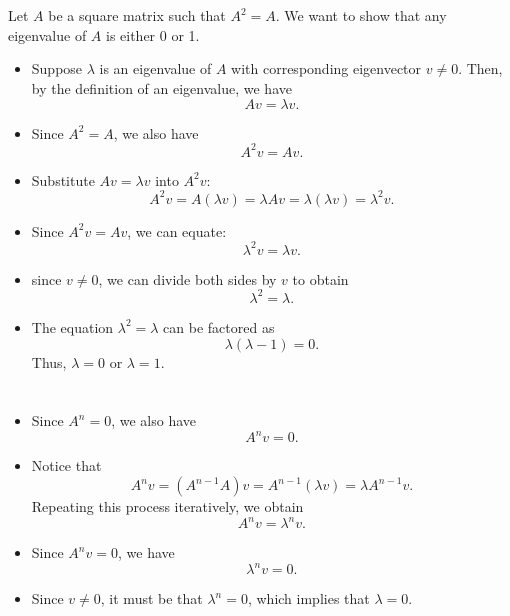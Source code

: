 \documentclass{article}
\begin{document}
\section{}
Let \( A \) be a square matrix such that \( A^2 = A \).
We want to show that any eigenvalue of \( A \) is either 0 or 1.

\begin{itemize}
    \item Suppose \( \lambda \) is an eigenvalue of \( A \) with corresponding eigenvector \( v \neq 0 \). Then, by the definition of an eigenvalue, we have
          \[
              A v = \lambda v.
          \]

    \item Since \( A^2 = A \), we also have
          \[
              A^2 v = A v.
          \]

    \item Substitute \( A v = \lambda v \) into \( A^2 v \):
          \[
              A^2 v = A(\lambda v) = \lambda A v = \lambda (\lambda v) = \lambda^2 v.
          \]

    \item Since \( A^2 v = A v \), we can equate:
          \[
              \lambda^2 v = \lambda v.
          \]

    \item since \( v \neq 0 \), we can divide both sides by \( v \) to obtain
          \[
              \lambda^2 = \lambda.
          \]

    \item The equation \( \lambda^2 = \lambda \) can be factored as
          \[
              \lambda (\lambda - 1) = 0.
          \]
          Thus, \( \lambda = 0 \) or \( \lambda = 1 \).
\end{itemize}

\section{}
\begin{itemize}
    \item Since \( A^n = 0 \), we also have
          \[A^n v = 0.\]

    \item Notice that
          \[A^n v = (A^{n-1} A) v = A^{n-1} (\lambda v) = \lambda A^{n-1} v.\]
          Repeating this process iteratively, we obtain
          \[A^n v = \lambda^n v.\]

    \item  Since \( A^n v = 0 \), we have
          \[\lambda^n v = 0.\]

    \item Since \( v \neq 0 \), it must be that \( \lambda^n = 0 \), which implies that \( \lambda = 0 \).
\end{itemize}
\end{document}
